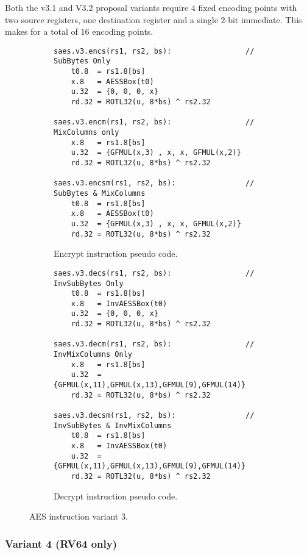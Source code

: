 Both the v3.1 and V3.2 proposal variants require $4$ fixed encoding
points with two source registers, one destination register and
a single $2$-bit immediate.
This makes for a total of $16$ encoding points.

\begin{figure}
\begin{subfigure}[b]{1.0\textwidth}
\begin{lstlisting}
saes.v3.encs(rs1, rs2, bs):                 // SubBytes Only
    t0.8  = rs1.8[bs]
    x.8   = AESSBox(t0)
    u.32  = {0, 0, 0, x}
    rd.32 = ROTL32(u, 8*bs) ^ rs2.32

saes.v3.encm(rs1, rs2, bs):                 // MixColumns only
    x.8   = rs1.8[bs]
    u.32  = {GFMUL(x,3) , x, x, GFMUL(x,2)}
    rd.32 = ROTL32(u, 8*bs) ^ rs2.32

saes.v3.encsm(rs1, rs2, bs):                // SubBytes & MixColumns
    t0.8  = rs1.8[bs]
    x.8   = AESSBox(t0)
    u.32  = {GFMUL(x,3) , x, x, GFMUL(x,2)}
    rd.32 = ROTL32(u, 8*bs) ^ rs2.32
\end{lstlisting}
\caption{Encrypt instruction pseudo code.}
\label{fig:pesudo:aes:v3:enc}
\end{subfigure}

\begin{subfigure}[b]{1.0\textwidth}
\begin{lstlisting}
saes.v3.decs(rs1, rs2, bs):                 // InvSubBytes Only
    t0.8  = rs1.8[bs]
    x.8   = InvAESSBox(t0)
    u.32  = {0, 0, 0, x}
    rd.32 = ROTL32(u, 8*bs) ^ rs2.32

saes.v3.decm(rs1, rs2, bs):                 // InvMixColumns Only
    x.8   = rs1.8[bs]
    u.32  = {GFMUL(x,11),GFMUL(x,13),GFMUL(9),GFMUL(14)}
    rd.32 = ROTL32(u, 8*bs) ^ rs2.32

saes.v3.decsm(rs1, rs2, bs):                // InvSubBytes & InvMixColumns
    t0.8  = rs1.8[bs]
    x.8   = InvAESSBox(t0)
    u.32  = {GFMUL(x,11),GFMUL(x,13),GFMUL(9),GFMUL(14)}
    rd.32 = ROTL32(u, 8*bs) ^ rs2.32
\end{lstlisting}
\caption{Decrypt instruction pseudo code.}
\label{fig:pesudo:aes:v3:dec}
\end{subfigure}
\caption{AES instruction variant 3.}
\label{fig:pseudo:aes:v3}
\end{figure}



\subsubsection{Variant 4 (RV64 only)}

